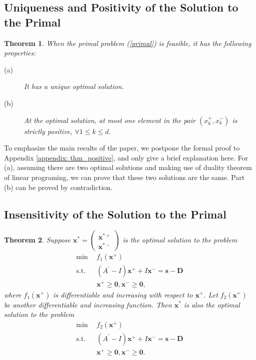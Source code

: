 \documentclass[final,11pt,3p]{article}\usepackage{setspace}
\newtheorem{theorem}{Theorem}
\begin{document}
\subsection{Uniqueness and Positivity of the Solution to the Primal}

\begin{theorem}
\label{thm_positive} When the primal problem (\ref{primal}) is feasible, it has the following properties:

\begin{description}

\item[(a)] It has a unique optimal solution.

\item[(b)] At the optimal solution, at most one element in the pair
$(x_{k}^{+}, x_{k}^{-})$ is strictly positive, $\forall1 \le k \le d$.
\end{description}
\end{theorem}

To emphasize the main results of the paper, we postpone the formal proof to Appendix \ref{appendix: thm_positive}, and only give a brief explanation here. For (a), assuming there are two optimal solutions and making use of duality theorem of linear programing, we can prove that these two solutions are the same. Part (b) can be proved by contradiction. 

\subsection{Insensitivity of the Solution to the Primal}

\begin{theorem}
\label{thm_insensitivity} Suppose
${\boldsymbol{x}^*}=\begin{pmatrix}
{\boldsymbol{x}}^{*+}\\
{\boldsymbol{x}}^{*-}\end{pmatrix}
$ is the optimal solution to the problem
\begin{align*}
\min~~  & f_{1}(\boldsymbol{x}^{+})\\
\text{s.t.}~~ &  (A^{\prime}- I) \boldsymbol{x}^{+} + I \boldsymbol{x}^{-} =
\boldsymbol{s}-\boldsymbol{D}\\ &  \boldsymbol{x}^{+} \ge\boldsymbol{0}, \boldsymbol{x}^{-} \ge\boldsymbol{0},
\end{align*}
where $f_{1}(\boldsymbol{x}^{+})$ is differentiable and increasing with respect to $\boldsymbol{x}^+$. Let
$f_{2}(\boldsymbol{x}^{+})$ be another differentiable and increasing function.
Then $\boldsymbol{x}^*$ is also the optimal solution to the problem
\begin{align*}
\min~~  & f_{2}(\boldsymbol{x}^{+})\\
\text{s.t.}~~ &  (A^{\prime}- I) \boldsymbol{x}^{+} + I \boldsymbol{x}^{-} =
\boldsymbol{s}-\boldsymbol{D}\\ &  \boldsymbol{x}^{+} \ge\boldsymbol{0}, \boldsymbol{x}^{-} \ge\boldsymbol{0}.
\end{align*}
\end{theorem}
\end{document}
